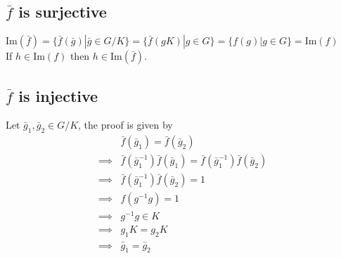 \documentclass{article}
\renewcommand{\Im}{\text{Im}}
\begin{document}
	\subsection*{$\bar{f}$ is surjective}
	$\Im(\bar{f})=\{\bar{f}(\bar{g})|\bar{g}\in G/K\}=\{\bar{f}(gK)|g\in G\}=\{f(g)|g\in G\}=\Im(f)$\\
	If $h\in\Im(f)$ then $h\in\Im(\bar{f})$.
	\subsection*{$\bar{f}$ is injective}
	Let $\bar{g}_1,\bar{g}_2\in G/K$, the proof is given by \begin{align*}
		&\bar{f}(\bar{g}_1)=\bar{f}(\bar{g}_2) \\
		\implies &
		\bar{f}(\bar{g}_1^{-1})\bar{f}(\bar{g}_1)=\bar{f}(\bar{g}_1^{-1})\bar{f}(\bar{g}_2) \\
		\implies &
		\bar{f}(\bar{g}_1^{-1})\bar{f}(\bar{g}_2)=1\\
		\implies & f(g^{-1}g)=1\\
		\implies & g^{-1}g\in K\\
		\implies & g_1K=g_2K\\
		\implies & \bar{g}_1=\bar{g}_2
	\end{align*}
\end{document}
